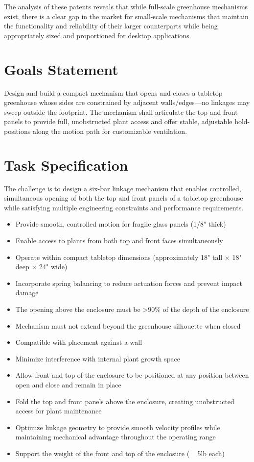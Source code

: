 \documentclass[12pt]{article}
\begin{document}
The analysis of these patents reveals that while full-scale greenhouse mechanisms exist, there is a clear gap in the market for small-scale mechanisms that maintain the functionality and reliability of their larger counterparts while being appropriately sized and proportioned for desktop applications.

\section{Goals Statement}
Design and build a compact mechanism that opens and closes a tabletop greenhouse whose sides are constrained by adjacent walls/edges—no linkages may sweep outside the footprint. The mechanism shall articulate the top and front panels to provide full, unobstructed plant access and offer stable, adjustable hold-positions along the motion path for customizable ventilation.

\section{Task Specification}
The challenge is to design a six-bar linkage mechanism that enables controlled, simultaneous opening of both the top and front panels of a tabletop greenhouse while satisfying multiple engineering constraints and performance requirements.

\begin{itemize}
    \item Provide smooth, controlled motion for fragile glass panels (1/8" thick)
    \item Enable access to plants from both top and front faces simultaneously
    \item Operate within compact tabletop dimensions (approximately 18" tall × 18" deep × 24" wide)
    \item Incorporate spring balancing to reduce actuation forces and prevent impact damage
    \item The opening above the enclosure must be >90\% of the depth of the enclosure
    \item Mechanism must not extend beyond the greenhouse silhouette when closed
    \item Compatible with placement against a wall
    \item Minimize interference with internal plant growth space
    \item Allow front and top of the enclosure to be positioned at any position between open and close and remain in place
    \item Fold the top and front panels above the enclosure, creating unobstructed access for plant maintenance
    \item Optimize linkage geometry to provide smooth velocity profiles while maintaining mechanical advantage throughout the operating range
    \item Support the weight of the front and top of the enclosure ( ~ 5lb each)
\end{itemize}
\end{document}
